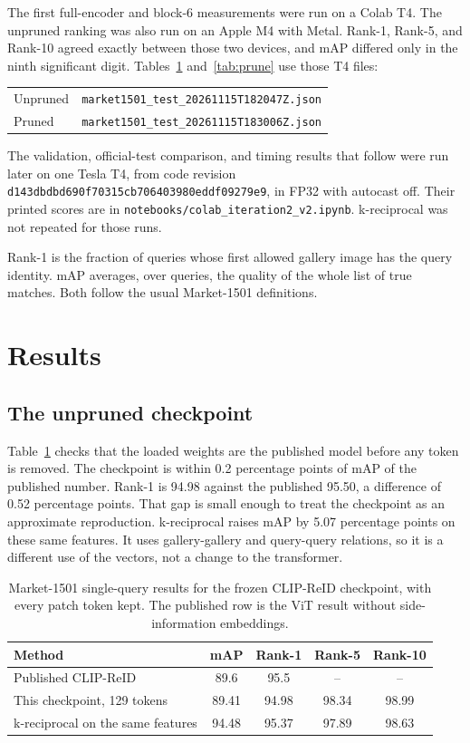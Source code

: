 \documentclass[11pt]{article}
\begin{document}
The first full-encoder and block-6 measurements were run on a Colab T4.
The unpruned ranking was also run on an Apple M4 with Metal.
Rank-1, Rank-5, and Rank-10 agreed exactly between those two devices, and mAP differed only in the ninth significant digit.
Tables~\ref{tab:visual} and~\ref{tab:prune} use those T4 files:
\begin{center}
\small
\begin{tabular}{@{}ll@{}}
Unpruned & \texttt{market1501\_test\_20261115T182047Z.json} \\
Pruned & \texttt{market1501\_test\_20261115T183006Z.json} \\
\end{tabular}
\end{center}
The validation, official-test comparison, and timing results that follow were run later on one Tesla T4, from code revision \texttt{d143dbdbd690f70315cb706403980eddf09279e9}, in FP32 with autocast off.
Their printed scores are in \texttt{notebooks/colab\_iteration2\_v2.ipynb}.
k-reciprocal was not repeated for those runs.

Rank-1 is the fraction of queries whose first allowed gallery image has the query identity.
mAP averages, over queries, the quality of the whole list of true matches.
Both follow the usual Market-1501 definitions.

\section{Results}
\subsection{The unpruned checkpoint}
Table~\ref{tab:visual} checks that the loaded weights are the published model before any token is removed.
The checkpoint is within 0.2 percentage points of mAP of the published number.
Rank-1 is 94.98 against the published 95.50, a difference of 0.52 percentage points.
That gap is small enough to treat the checkpoint as an approximate reproduction.
k-reciprocal raises mAP by 5.07 percentage points on these same features.
It uses gallery-gallery and query-query relations, so it is a different use of the vectors, not a change to the transformer.

\begin{table}[H]
\centering
\caption{Market-1501 single-query results for the frozen CLIP-ReID checkpoint, with every patch token kept. The published row is the ViT result without side-information embeddings.}
\label{tab:visual}
\begin{tabular}{lcccc}
\toprule
Method & mAP & Rank-1 & Rank-5 & Rank-10 \\
\midrule
Published CLIP-ReID \cite{li2023clipreid} & 89.6 & 95.5 & -- & -- \\
This checkpoint, 129 tokens & 89.41 & 94.98 & 98.34 & 98.99 \\
k-reciprocal on the same features & 94.48 & 95.37 & 97.89 & 98.63 \\
\bottomrule
\end{tabular}
\end{table}
\end{document}
